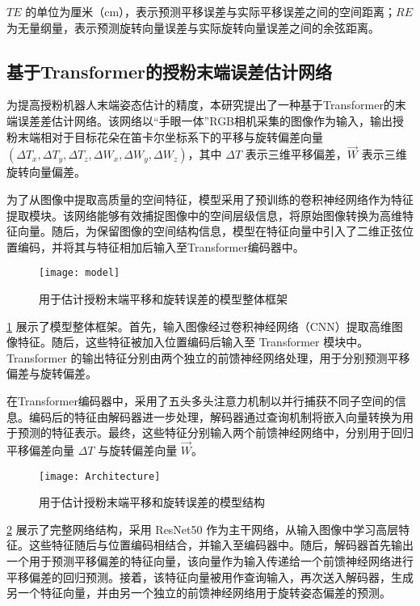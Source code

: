 $TE$ 的单位为厘米（cm），表示预测平移误差与实际平移误差之间的空间距离；$RE$ 为无量纲量，表示预测旋转向量误差与实际旋转向量误差之间的余弦距离。

\subsection{基于Transformer的授粉末端误差估计网络}

为提高授粉机器人末端姿态估计的精度，本研究提出了一种基于Transformer的末端误差差估计网络。该网络以“手眼一体”RGB相机采集的图像作为输入，输出授粉末端相对于目标花朵在笛卡尔坐标系下的平移与旋转偏差向量 $(\Delta T_{x}, \Delta T_{y}, \Delta T_{z},\Delta W_{x}, \Delta W_{y}, \Delta W_{z})$，其中 $\Delta T$ 表示三维平移偏差，$\overrightarrow{W}$ 表示三维旋转向量偏差。


为了从图像中提取高质量的空间特征，模型采用了预训练的卷积神经网络作为特征提取模块。该网络能够有效捕捉图像中的空间层级信息，将原始图像转换为高维特征向量。随后，为保留图像的空间结构信息，模型在特征向量中引入了二维正弦位置编码，并将其与特征相加后输入至Transformer编码器中。

\begin{figure}[htb]
	\texttt{[image: model]}
	\caption[用于估计授粉末端平移和旋转误差的模型整体框架]{用于估计授粉末端平移和旋转误差的模型整体框架} %
	\label{fig:effective3}
\end{figure}

\cref{fig:effective3} 展示了模型整体框架。首先，输入图像经过卷积神经网络（CNN）提取高维图像特征。随后，这些特征被加入位置编码后输入至 Transformer 模块中。Transformer 的输出特征分别由两个独立的前馈神经网络处理，用于分别预测平移偏差与旋转偏差。

在Transformer编码器中，采用了五头多头注意力机制以并行捕获不同子空间的信息。编码后的特征由解码器进一步处理，解码器通过查询机制将嵌入向量转换为用于预测的特征表示。最终，这些特征分别输入两个前馈神经网络中，分别用于回归平移偏差向量 $\Delta T$ 与旋转偏差向量 $\overrightarrow{W}$。

\begin{figure}[htb]
	\texttt{[image: Architecture]}
	\caption[用于估计授粉末端平移和旋转误差的模型结构]{用于估计授粉末端平移和旋转误差的模型结构
	} %
	\label{fig:effective4}
\end{figure}
\cref{fig:effective4} 展示了完整网络结构，采用 ResNet50 作为主干网络，从输入图像中学习高层特征。这些特征随后与位置编码相结合，并输入至编码器中。随后，解码器首先输出一个用于预测平移偏差的特征向量，该向量作为输入传递给一个前馈神经网络进行平移偏差的回归预测。接着，该特征向量被用作查询输入，再次送入解码器，生成另一个特征向量，并由另一个独立的前馈神经网络用于旋转姿态偏差的预测。




